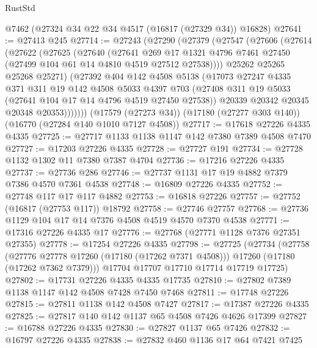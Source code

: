 \begin{lexlean}{RustStd}
\begin{coremodule}
{\begin{coremodule}
{{{{{{{{{{{{{{{{{{{{{{{{{{{{{{{{{{{{{{{{{{{{{{{{{{{{{{{    @7462
    (@27324 @34 @22 @34 @4517 (@16817 (@27329 @34)) @16828)
@27641 := @27413 @245
@27714 := @27243
    (@27290
      (@27379
        (@27547
          (@27606
            (@27614
              (@27622
                (@27625
                  (@27640
                    (@27641
                      @269
                      @17
                      @1321
                      @4796
                      @7461
                      @27450
                      (@27499 @104 @61 @14 @4810 @4519 @27512 @27538))))
                @25262
                @25265
                @25268
                @25271)
              (@27392
                @404
                @142
                @4508
                @5138
                (@17073
                  @27247
                  @4335
                  @371
                  @311
                  @19
                  @142
                  @4508
                  @5033
                  @4397
                  @703
                  (@27408 @311 @19 @5033 (@27641 @104 @17 @14 @4796 @4519 @27450 @27538))
                  @20339
                  @20342
                  @20345
                  @20348
                  @20353)))))))
    (@17579 (@27273 @34))
    (@17180 (@27277 @303 @140))
    (@16770 (@27284 @140 @1010 @7127 @4508))
@27717 := @17618 @27226 @4335 @4335
@27725 := @27717 @1133 @1138 @1147 @142 @7380 @7389 @4508 @7470
@27727 := @17203 @27226 @4335
@27728 := @27727 @191
@27734 := @27728 @1132 @1302 @11 @7380 @7387 @4704
@27736 := @17216 @27226 @4335
@27737 := @27736 @286
@27746 := @27737 @1131 @17 @19 @4882 @7379 @7386 @4570 @7361 @4538
@27748 := @16809 @27226 @4335
@27752 := @27748 @117 @17 @117 @4882
@27753 := @16818 @27226
@27757 := @27752 (@16817 (@27753 @117)) @18792
@27758 := @27746 @27757
@27768 := @27736 @1129 @104 @17 @14 @7376 @4508 @4519 @4570 @7370 @4538
@27771 := @17316 @27226 @4335 @17
@27776 := @27768 (@27771 @1128 @7376 @27351 @27355)
@27778 := @17254 @27226 @4335
@27798 := @27725
    (@27734
      (@27758
        (@27776 @27778 @17260 (@17180 (@17262 @7371 @4508)))
        @17260
        (@17180 (@17262 @7362 @7379)))
      @17704
      @17707
      @17710
      @17714
      @17719
      @17725)
@27802 := @17731 @27226 @4335 @4335 @17735
@27810 := @27802 @7389 @1138 @1147 @142 @4508 @7428 @7450 @7468
@27811 := @17748 @27226
@27815 := @27811 @1138 @142 @4508 @7427
@27817 := @17387 @27226 @4335
@27825 := @27817 @140 @142 @1137 @65 @4508 @7426 @4626 @17399
@27827 := @16788 @27226 @4335
@27830 := @27827 @1137 @65 @7426
@27832 := @16797 @27226 @4335
@27838 := @27832 @460 @1136 @17 @64 @7421 @7425
}}}}}}}}}}}}}}}}}}}}}}}}}}}}}}}}}}}}}}}}}}}}}}}}}}}}}}}
\end{coremodule}}
\end{coremodule}
\end{lexlean}
